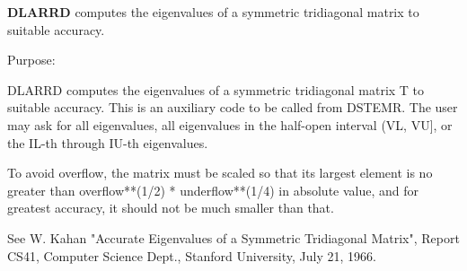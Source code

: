 {\bfseries D\+L\+A\+R\+R\+D} computes the eigenvalues of a symmetric tridiagonal matrix to suitable accuracy. 

 \begin{DoxyParagraph}{Purpose\+: }
\begin{DoxyVerb} DLARRD computes the eigenvalues of a symmetric tridiagonal
 matrix T to suitable accuracy. This is an auxiliary code to be
 called from DSTEMR.
 The user may ask for all eigenvalues, all eigenvalues
 in the half-open interval (VL, VU], or the IL-th through IU-th
 eigenvalues.

 To avoid overflow, the matrix must be scaled so that its
 largest element is no greater than overflow**(1/2) * underflow**(1/4) in absolute value, and for greatest
 accuracy, it should not be much smaller than that.

 See W. Kahan "Accurate Eigenvalues of a Symmetric Tridiagonal
 Matrix", Report CS41, Computer Science Dept., Stanford
 University, July 21, 1966.\end{DoxyVerb}
 
\end{DoxyParagraph}

